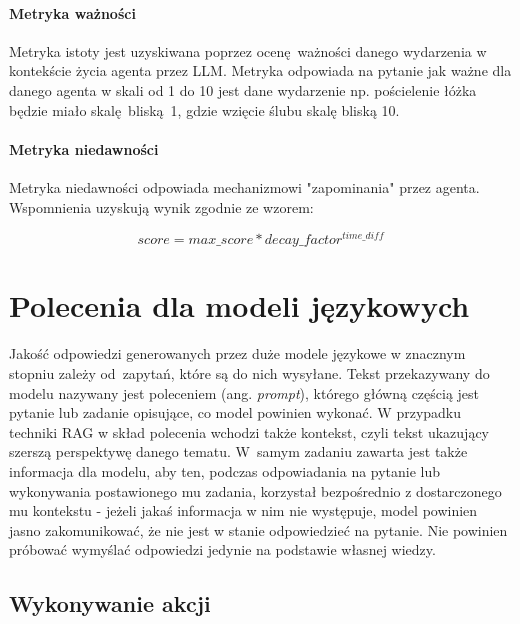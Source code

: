 \paragraph{Metryka ważności}
Metryka istoty jest uzyskiwana
poprzez ocenę ważności danego wydarzenia w kontekście życia agenta przez LLM.
Metryka odpowiada na pytanie jak ważne dla danego agenta w skali od 1 do 10 jest
dane wydarzenie np. pościelenie łóżka będzie miało skalę bliską 1, gdzie wzięcie
ślubu skalę bliską 10.

\paragraph{Metryka niedawności}
Metryka niedawności odpowiada mechanizmowi "zapominania" przez agenta.
Wspomnienia uzyskują wynik zgodnie ze wzorem:

\begin{equation}
 \label{eq:metryka_niedawnosci}
	score = max\_score * decay\_factor ^ {time\_diff}
\end{equation}




\section{Polecenia dla modeli językowych}

Jakość odpowiedzi generowanych przez duże modele językowe w znacznym stopniu zależy od~zapytań, które są do nich wysyłane. Tekst przekazywany do modelu nazywany jest poleceniem (ang. \textit{prompt}), którego główną częścią jest pytanie lub zadanie opisujące, co model powinien wykonać. W przypadku techniki RAG w skład polecenia wchodzi także kontekst, czyli tekst ukazujący szerszą perspektywę danego tematu. W~samym zadaniu zawarta jest także informacja dla modelu, aby ten, podczas odpowiadania na pytanie lub wykonywania postawionego mu zadania, korzystał bezpośrednio z dostarczonego mu kontekstu - jeżeli jakaś informacja w nim nie występuje, model powinien jasno zakomunikować, że nie jest w stanie odpowiedzieć na pytanie. Nie powinien próbować wymyślać odpowiedzi jedynie na podstawie własnej wiedzy.

\subsection{Wykonywanie akcji}

